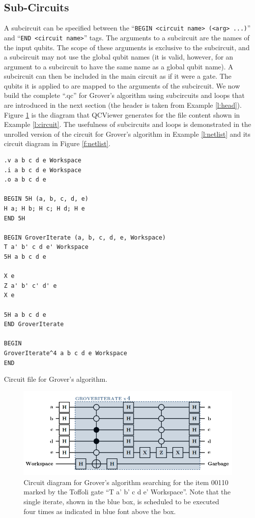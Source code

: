 \documentclass[aps,prl,reprint,floatfix,superscriptaddress]{revtex4-1} %
\begin{document}
\subsection{Sub-Circuits}
A subcircuit can be specified between the ``\verb+BEGIN <circuit name> (<arg> ...)+'' and ``\verb+END <circuit name>+'' tags. The arguments to a subcircuit are the names of the input qubits. The scope of these arguments is exclusive to the subcircuit, and a subcircuit may not use the global qubit names (it is valid, however, for an argument to a subcircuit to have the same name as a global qubit name). A subcircuit can then be included
in the main circuit as if it were a gate. The qubits it is applied to are mapped to the arguments of the subcircuit. We now build the complete ``.qc'' for Grover's algorithm 
using subcircuits and loops that are introduced in the next section (the header is taken from Example \ref{l:head}). Figure \ref{f:grover} is the diagram that QCViewer generates for the file content shown in Example \ref{l:circuit}.  The usefulness of subcircuits and loops is demonstrated in the
unrolled version of the circuit for Grover's algorithm in Example \ref{l:netlist} and its circuit diagram in Figure \ref{f:netlist}.
\begin{program}

\begin{verbatim}
.v a b c d e Workspace
.i a b c d e Workspace
.o a b c d e

BEGIN 5H (a, b, c, d, e)
H a; H b; H c; H d; H e
END 5H

BEGIN GroverIterate (a, b, c, d, e, Workspace)
T a' b' c d e' Workspace
5H a b c d e

X e
Z a' b' c' d' e
X e

5H a b c d e
END GroverIterate

BEGIN
GroverIterate^4 a b c d e Workspace
END
\end{verbatim}
\caption{Circuit file for Grover's algorithm.}
\label{l:circuit}
\end{program}
\begin{figure}
\includegraphics[scale=0.32]{grover_circuit}
\caption{Circuit diagram for Grover's algorithm searching for the item 00110 marked by the Toffoli gate 
``T a' b' c d e' Workspace''. Note that the single iterate, shown in the blue box, is scheduled to be 
executed four times as indicated in blue font above the box.}
\label{f:grover}
\end{figure}
\end{document}
